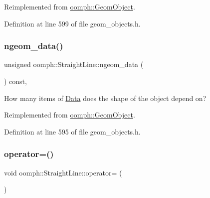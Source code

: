 Reimplemented from \hyperlink{classoomph_1_1GeomObject_ae1940fc6a3050e645c3882f2f6f3a202}{oomph\+::\+Geom\+Object}.



Definition at line 599 of file geom\+\_\+objects.\+h.

\mbox{\label{classoomph_1_1StraightLine_abcc547cb889a1447cac0827698d5c8ca}} 
\subsubsection{\texorpdfstring{ngeom\+\_\+data()}{ngeom\_data()}}
{\footnotesize\ttfamily unsigned oomph\+::\+Straight\+Line\+::ngeom\+\_\+data (\begin{DoxyParamCaption}{ }\end{DoxyParamCaption}) const\hspace{0.3cm}{\ttfamily [inline]}, {\ttfamily [virtual]}}



How many items of \hyperlink{classoomph_1_1Data}{Data} does the shape of the object depend on? 



Reimplemented from \hyperlink{classoomph_1_1GeomObject_a19d325347e19964e127fe124df56f251}{oomph\+::\+Geom\+Object}.



Definition at line 595 of file geom\+\_\+objects.\+h.

\mbox{\label{classoomph_1_1StraightLine_abec0557bf6cca23737db39767457059a}} 
\subsubsection{\texorpdfstring{operator=()}{operator=()}}
{\footnotesize\ttfamily void oomph\+::\+Straight\+Line\+::operator= (\begin{DoxyParamCaption}\item[{const \hyperlink{classoomph_1_1StraightLine}{Straight\+Line} \&}]{ }\end{DoxyParamCaption})\hspace{0.3cm}{\ttfamily [inline]}}



